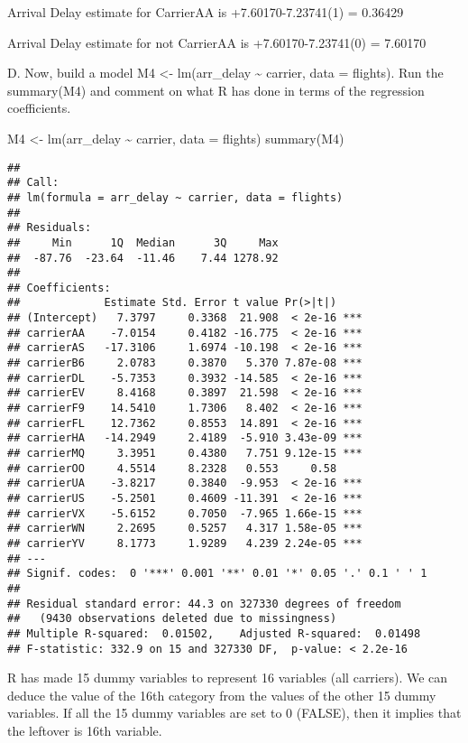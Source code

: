 \documentclass[
]{article}
\newenvironment{Shaded}{\begin{snugshade}}{\end{snugshade}}
\newcommand{\AttributeTok}[1]{\textcolor[rgb]{0.77,0.63,0.00}{#1}}
\newcommand{\FunctionTok}[1]{\textcolor[rgb]{0.00,0.00,0.00}{#1}}
\newcommand{\NormalTok}[1]{#1}
\newcommand{\OtherTok}[1]{\textcolor[rgb]{0.56,0.35,0.01}{#1}}
\newcommand{\SpecialCharTok}[1]{\textcolor[rgb]{0.00,0.00,0.00}{#1}}
\begin{document}
Arrival Delay estimate for CarrierAA is +7.60170-7.23741(1) = 0.36429

Arrival Delay estimate for not CarrierAA is +7.60170-7.23741(0) =
7.60170

D. Now, build a model M4 \textless- lm(arr\_delay \textasciitilde{}
carrier, data = flights). Run the summary(M4) and comment on what R has
done in terms of the regression coefficients.

\begin{Shaded}
\begin{Highlighting}[]
\NormalTok{M4 }\OtherTok{\textless{}{-}} \FunctionTok{lm}\NormalTok{(arr\_delay }\SpecialCharTok{\textasciitilde{}}\NormalTok{ carrier, }\AttributeTok{data =}\NormalTok{ flights)}
\FunctionTok{summary}\NormalTok{(M4)}
\end{Highlighting}
\end{Shaded}

\begin{verbatim}
## 
## Call:
## lm(formula = arr_delay ~ carrier, data = flights)
## 
## Residuals:
##     Min      1Q  Median      3Q     Max 
##  -87.76  -23.64  -11.46    7.44 1278.92 
## 
## Coefficients:
##             Estimate Std. Error t value Pr(>|t|)    
## (Intercept)   7.3797     0.3368  21.908  < 2e-16 ***
## carrierAA    -7.0154     0.4182 -16.775  < 2e-16 ***
## carrierAS   -17.3106     1.6974 -10.198  < 2e-16 ***
## carrierB6     2.0783     0.3870   5.370 7.87e-08 ***
## carrierDL    -5.7353     0.3932 -14.585  < 2e-16 ***
## carrierEV     8.4168     0.3897  21.598  < 2e-16 ***
## carrierF9    14.5410     1.7306   8.402  < 2e-16 ***
## carrierFL    12.7362     0.8553  14.891  < 2e-16 ***
## carrierHA   -14.2949     2.4189  -5.910 3.43e-09 ***
## carrierMQ     3.3951     0.4380   7.751 9.12e-15 ***
## carrierOO     4.5514     8.2328   0.553     0.58    
## carrierUA    -3.8217     0.3840  -9.953  < 2e-16 ***
## carrierUS    -5.2501     0.4609 -11.391  < 2e-16 ***
## carrierVX    -5.6152     0.7050  -7.965 1.66e-15 ***
## carrierWN     2.2695     0.5257   4.317 1.58e-05 ***
## carrierYV     8.1773     1.9289   4.239 2.24e-05 ***
## ---
## Signif. codes:  0 '***' 0.001 '**' 0.01 '*' 0.05 '.' 0.1 ' ' 1
## 
## Residual standard error: 44.3 on 327330 degrees of freedom
##   (9430 observations deleted due to missingness)
## Multiple R-squared:  0.01502,    Adjusted R-squared:  0.01498 
## F-statistic: 332.9 on 15 and 327330 DF,  p-value: < 2.2e-16
\end{verbatim}

R has made 15 dummy variables to represent 16 variables (all carriers).
We can deduce the value of the 16th category from the values of the
other 15 dummy variables. If all the 15 dummy variables are set to 0
(FALSE), then it implies that the leftover is 16th variable.
\end{document}
